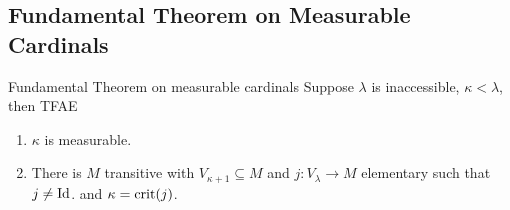\documentclass{article}
\begin{document}
\subsection{Fundamental Theorem on Measurable Cardinals}
\begin{fancythm}{Fundamental Theorem on measurable cardinals}
    Suppose $\lambda$ is inaccessible, $\kappa < \lambda$, then TFAE \begin{enumerate}
        \item[(i)] $\kappa$ is measurable.
        \item[(ii)] There is $M$ transitive with $V_{\kappa+1} \subseteq M$ and $j: V_{\lambda} \to M$ elementary such that $j \neq \operatorname{Id}$. and $\kappa = \operatorname{crit}(j)$.
    \end{enumerate}
\end{fancythm}
\proof \hspace{0.1cm}
\end{document}
